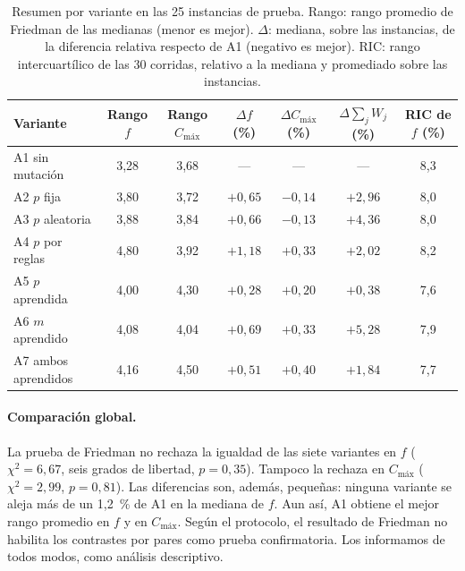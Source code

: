 \documentclass[10pt,a4paper]{article}
\newcommand{\Cmax}{C_{\text{máx}}}
\newcommand{\dc}{{,}}%
\begin{document}
\begin{table}[htb]
\centering\small
\caption{Resumen por variante en las 25 instancias de prueba. Rango: rango promedio de Friedman
de las medianas (menor es mejor). $\Delta$: mediana, sobre las instancias, de la diferencia
relativa respecto de A1 (negativo es mejor). RIC: rango intercuartílico de las 30 corridas,
relativo a la mediana y promediado sobre las instancias.}
\label{tab:res}
\begin{tabular}{@{}lcccccc@{}}
\toprule
Variante & Rango $f$ & Rango $\Cmax$ & $\Delta f$ (\%) & $\Delta\Cmax$ (\%) & $\Delta\sum_j W_j$ (\%) & RIC de $f$ (\%) \\
\midrule
A1 sin mutación            & 3,28 & 3,68 & ---       & ---       & ---       & 8,3 \\
A2 $p$ fija                & 3,80 & 3,72 & $+0{,}65$ & $-0{,}14$ & $+2{,}96$ & 8,0 \\
A3 $p$ aleatoria           & 3,88 & 3,84 & $+0{,}66$ & $-0{,}13$ & $+4{,}36$ & 8,0 \\
A4 $p$ por reglas          & 4,80 & 3,92 & $+1{,}18$ & $+0{,}33$ & $+2{,}02$ & 8,2 \\
A5 $p$ aprendida           & 4,00 & 4,30 & $+0{,}28$ & $+0{,}20$ & $+0{,}38$ & 7,6 \\
A6 $m$ aprendido           & 4,08 & 4,04 & $+0{,}69$ & $+0{,}33$ & $+5{,}28$ & 7,9 \\
A7 ambos aprendidos        & 4,16 & 4,50 & $+0{,}51$ & $+0{,}40$ & $+1{,}84$ & 7,7 \\
\bottomrule
\end{tabular}
\end{table}

\paragraph{Comparación global.}
La prueba de Friedman no rechaza la igualdad de las siete variantes en $f$ ($\chi^2=6\dc67$, seis
grados de libertad, $p=0\dc35$). Tampoco la rechaza en $\Cmax$ ($\chi^2=2\dc99$, $p=0\dc81$).
Las diferencias son, además, pequeñas: ninguna variante se aleja más de un 1,2~\% de A1 en la
mediana de $f$. Aun así, A1 obtiene el mejor rango promedio en $f$ y en $\Cmax$. Según el
protocolo, el resultado de Friedman no habilita los contrastes por pares como prueba
confirmatoria. Los informamos de todos modos, como análisis descriptivo.
\end{document}
